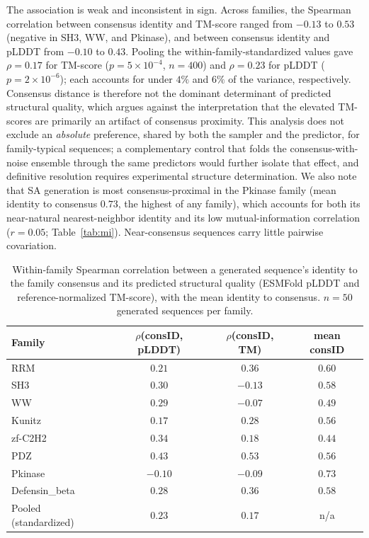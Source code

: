 \documentclass[10pt]{article}
\begin{document}
The association is weak and inconsistent in sign. Across families, the Spearman correlation between consensus identity and TM-score ranged from $-0.13$ to $0.53$ (negative in SH3, WW, and Pkinase), and between consensus identity and pLDDT from $-0.10$ to $0.43$. Pooling the within-family-standardized values gave $\rho{=}0.17$ for TM-score ($p{=}5\times10^{-4}$, $n{=}400$) and $\rho{=}0.23$ for pLDDT ($p{=}2\times10^{-6}$); each accounts for under $4\%$ and $6\%$ of the variance, respectively. Consensus distance is therefore not the dominant determinant of predicted structural quality, which argues against the interpretation that the elevated TM-scores are primarily an artifact of consensus proximity. This analysis does not exclude an \emph{absolute} preference, shared by both the sampler and the predictor, for family-typical sequences; a complementary control that folds the consensus-with-noise ensemble through the same predictors would further isolate that effect, and definitive resolution requires experimental structure determination. We also note that SA generation is most consensus-proximal in the Pkinase family (mean identity to consensus $0.73$, the highest of any family), which accounts for both its near-natural nearest-neighbor identity and its low mutual-information correlation ($r{=}0.05$; Table~\ref{tab:mi}). Near-consensus sequences carry little pairwise covariation.

\begin{table}[ht]
\centering
\caption{Within-family Spearman correlation between a generated sequence's identity to the family consensus and its predicted structural quality (ESMFold pLDDT and reference-normalized TM-score), with the mean identity to consensus. $n{=}50$ generated sequences per family.}
\label{tab:consensus-reg}
\small
\begin{tabular}{@{}lccc@{}}
\toprule
Family & $\rho$(consID, pLDDT) & $\rho$(consID, TM) & mean consID \\
\midrule
RRM            & $0.21$  & $0.36$  & $0.60$ \\
SH3            & $0.30$  & $-0.13$ & $0.58$ \\
WW             & $0.29$  & $-0.07$ & $0.49$ \\
Kunitz         & $0.17$  & $0.28$  & $0.56$ \\
zf-C2H2        & $0.34$  & $0.18$  & $0.44$ \\
PDZ            & $0.43$  & $0.53$  & $0.56$ \\
Pkinase        & $-0.10$ & $-0.09$ & $0.73$ \\
Defensin\_beta & $0.28$  & $0.36$  & $0.58$ \\
\midrule
Pooled (standardized) & $0.23$ & $0.17$ & n/a \\
\bottomrule
\end{tabular}
\end{table}
\end{document}
